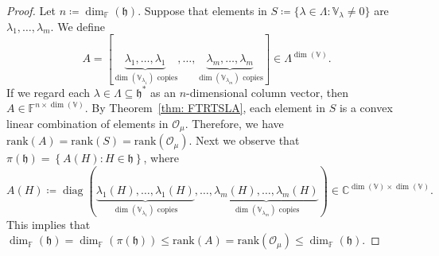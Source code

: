 \documentclass[11pt,reqno]{amsart}
\DeclareMathOperator{\diag}{diag}
\newcommand{\rank}{\mathrm{rank}} %
\newcommand{\FF}{\mathbb{F}} %
\begin{document}
\begin{proof}
Let $n \coloneqq \dim_{\FF} (\mathfrak{h})$. Suppose that elements in $S \coloneqq \{\lambda\in \Lambda: \mathbb{V}_{\lambda} \ne 0\}$ are $\lambda_1,  \dots,  \lambda_m$.  We define
\begin{equation}\label{lem:rank-orbit:eq1}
A = [
\underbrace{\lambda_1,\dots, \lambda_1}_{\dim (\mathbb{V}_{\lambda_1}) \text{~copies}},\dots,  \underbrace{\lambda_m,\dots, \lambda_m}_{\dim (\mathbb{V}_{\lambda_m}) \text{~copies}} ] \in \Lambda^{\dim (\mathbb{V})}.
\end{equation}
If we regard each $\lambda \in \Lambda \subseteq \mathfrak{h}^\ast$ as an $n$-dimensional column vector,  then $A  \in \mathbb{F}^{n \times \dim (\mathbb{V})}$.  By Theorem~\ref{thm: FTRTSLA}, each element in $S$ is a convex linear combination of elements in $\mathcal{O}_{\mu}$.  Therefore,  we have $\rank( A ) = \rank( S ) = \rank(\mathcal{O}_{\mu})$.  Next we observe that $\pi(\mathfrak{h}) = \left\lbrace
A(H): H\in \mathfrak{h}
\right\rbrace$,  where 
\begin{equation}\label{lem:rank-orbit:eq2}
A(H) \coloneqq \diag \left(
\underbrace{\lambda_1(H),\dots, \lambda_1(H)}_{\dim (\mathbb{V}_{\lambda_1}) \text{~copies}},\dots,  \underbrace{\lambda_m(H),\dots, \lambda_m(H)}_{\dim (\mathbb{V}_{\lambda_m}) \text{~copies}} \right) \in \mathbb{C}^{\dim (\mathbb{V}) \times \dim (\mathbb{V})}.
\end{equation}
This implies that $\dim_{\mathbb{F}} (\mathfrak{h}) = \dim_{\mathbb{F}} (\pi (\mathfrak{h})) \le \rank(A) = \rank(\mathcal{O}_{\mu}) \le \dim_{\mathbb{F}} (\mathfrak{h})$.
\end{proof}
\end{document}
